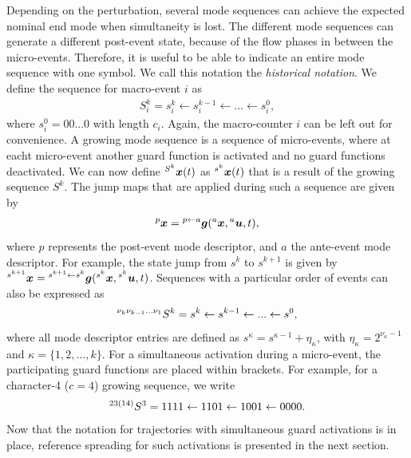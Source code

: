 \documentclass[../DC2017114Bouma.tex]{subfiles}
\begin{document}
Depending on the perturbation, several mode sequences can achieve the expected nominal end mode when simultaneity is lost. The different mode sequences can generate a different post-event state, because of the flow phases in between the micro-events. Therefore, it is useful to be able to indicate an entire mode sequence with one symbol. We call this notation the \textit{historical notation}. We define the sequence for macro-event $i$ as 
\begin{align}
S^k_i = s^k_i\leftarrow s^{k-1}_i\leftarrow ... \leftarrow s^0_i,
\end{align}
where $s^0_i = 00...0$ with length $c_i$. Again, the macro-counter $i$ can be left out for convenience. A growing mode sequence is a sequence of micro-events, where at eacht micro-event another guard function is activated and no guard functions deactivated. We can now define $\hspace{0cm}^{S^k}{\boldsymbol{x}}(t)$ as $\hspace{0cm}^{s^k}{\boldsymbol{x}}(t)$ that is a result of the growing sequence $S^k$. The jump maps that are applied during such a sequence are given by
\begin{align}
\hspace{0cm}^{p}{\boldsymbol{x}} = \hspace{0cm}^{p\leftarrow a}{\boldsymbol{g}}(\hspace{0cm}^{a}{\boldsymbol{x}},\hspace{0cm}^{a}{\boldsymbol{u}},t),
\end{align}
where $p$ represents the post-event mode descriptor, and $a$ the ante-event mode descriptor. For example, the state jump from $s^k$ to $s^{k+1}$ is given by $\hspace{0cm}^{s^{k+1}}{\boldsymbol{x}} = \hspace{0cm}^{s^{k+1}\leftarrow s^k}{\boldsymbol{g}}(\hspace{0cm}^{s^k}{\boldsymbol{x}},\hspace{0cm}^{s^k}{\boldsymbol{u}},t)$. Sequences with a particular order of events can also be expressed as
\begin{align}
\hspace{0cm}^{\nu_k \nu_{k-1}...\nu_{1}}S^k = s^k \leftarrow s^{k-1} \leftarrow ... \leftarrow s^0,
\end{align}
where all mode descriptor entries are defined as $s^{\kappa} = s^{\kappa-1} + \eta_{\kappa}$, with $\eta_{\kappa} = 2^{\nu_{\kappa}-1}$ and $\kappa = \{1,2,\dots,k\}$. For a simultaneous activation during a micro-event, the participating guard functions are placed within brackets. For example, for a character-4 ($c = 4$) growing sequence, we write 
\begin{align}
\hspace{0cm}^{23(14)}S^3 = 1111 \leftarrow 1101 \leftarrow 1001 \leftarrow 0000.
\end{align}
%
Now that the notation for trajectories with simultaneous guard activations is in place, reference spreading for such activations is presented in the next section.
\end{document}
